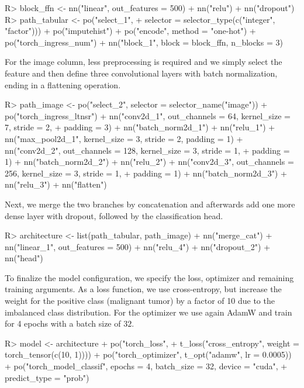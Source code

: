 \documentclass[article]{jss}
\theoremstyle{definition}
\begin{document}
\begin{CodeInput}
R> block_ffn <- nn("linear", out_features = 500) %
+    nn("relu") %
+    nn("dropout")
R> path_tabular <- po("select_1",
+      selector = selector_type(c("integer", "factor"))) %
+    po("imputehist") %
+    po("encode", method = "one-hot") %
+    po("torch_ingress_num") %
+    nn("block_1", block = block_ffn, n_blocks = 3)
\end{CodeInput}

For the image column, less preprocessing is required and we simply select the feature and then define three convolutional layers with batch normalization, ending in a flattening operation.

\begin{CodeInput}
R> path_image <- po("select_2", selector = selector_name("image")) %
+    po("torch_ingress_ltnsr") %
+    nn("conv2d_1", out_channels = 64, kernel_size = 7, stride = 2,
+      padding = 3) %
+    nn("batch_norm2d_1") %
+    nn("relu_1") %
+    nn("max_pool2d_1", kernel_size = 3, stride = 2, padding = 1) %
+    nn("conv2d_2", out_channels = 128, kernel_size = 3, stride = 1,
+      padding = 1) %
+    nn("batch_norm2d_2") %
+    nn("relu_2") %
+    nn("conv2d_3", out_channels = 256, kernel_size = 3, stride = 1,
+      padding = 1) %
+    nn("batch_norm2d_3") %
+    nn("relu_3") %
+    nn("flatten")
\end{CodeInput}

Next, we merge the two branches by concatenation and afterwards add one more dense layer with dropout, followed by the classification head.

\begin{CodeInput}
R> architecture <- list(path_tabular, path_image) %
+    nn("merge_cat") %
+    nn("linear_1", out_features = 500) %
+    nn("relu_4") %
+    nn("dropout_2") %
+    nn("head")
\end{CodeInput}

To finalize the model configuration, we specify the loss, optimizer and remaining training arguments.
As a loss function, we use cross-entropy, but increase the weight for the positive class (malignant tumor) by a factor of 10 due to the imbalanced class distribution.
For the optimizer we use again AdamW and train for 4 epochs with a batch size of $32$.

\begin{CodeInput}
R> model <- architecture %
+    po("torch_loss",
+      t_loss("cross_entropy", weight = torch_tensor(c(10, 1)))) %
+    po("torch_optimizer", t_opt("adamw", lr = 0.0005)) %
+    po("torch_model_classif", epochs = 4, batch_size = 32, device = "cuda",
+      predict_type = "prob")
\end{CodeInput}
\end{document}
